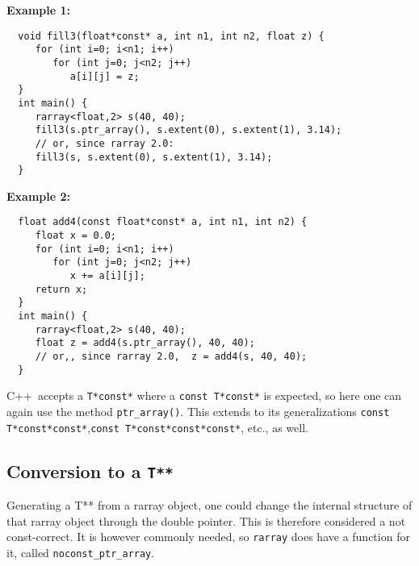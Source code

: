 \documentclass[11pt,twoside]{article}
\newcommand{\cxx}{C{++}}
\begin{document}
\noindent
{\bf Example 1:}
\vspace{-5pt}\begin{framed}\vspace{-14pt}%
\begin{verbatim}
  void fill3(float*const* a, int n1, int n2, float z) {
     for (int i=0; i<n1; i++)
        for (int j=0; j<n2; j++)
           a[i][j] = z;
  }
  int main() {
     rarray<float,2> s(40, 40);
     fill3(s.ptr_array(), s.extent(0), s.extent(1), 3.14);
     // or, since rarray 2.0:
     fill3(s, s.extent(0), s.extent(1), 3.14);
  }
\end{verbatim}%
\vspace{-14pt}\end{framed}\vspace{-8pt}

\noindent
{\bf Example 2:}
\vspace{-5pt}\begin{framed}\vspace{-14pt}%
\begin{verbatim}
  float add4(const float*const* a, int n1, int n2) {
     float x = 0.0;
     for (int i=0; i<n1; i++)
        for (int j=0; j<n2; j++)
           x += a[i][j];
     return x;
  }
  int main() {
     rarray<float,2> s(40, 40);
     float z = add4(s.ptr_array(), 40, 40);
     // or,, since rarray 2.0,  z = add4(s, 40, 40);
  }
\end{verbatim}%
\vspace{-14pt}
\end{framed}

\noindent
\cxx\ accepts a \texttt{T*const*} where a \texttt{const T*const*} is expected, so here one can again use the method \texttt{ptr\_array()}.
This extends to its generalizations \texttt{const T*const*const*},\linebreak \texttt{const T*const*const*const*}, etc., as well.


\subsection{Conversion to a {\tt T**}}

\noindent
Generating a T** from a rarray object, one could change the internal structure of that rarray object through the double pointer.  This is therefore considered a not const-correct.  It is however commonly needed, so \texttt{rarray} does have a function for it, called \texttt{noconst\_ptr\_array}. 
\end{document}
